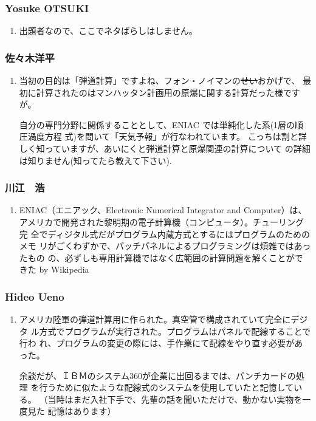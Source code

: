 \documentclass[cjk,dvipdfmx,10pt,compress,%
hyperref={bookmarks=true,bookmarksnumbered=true,bookmarksopen=false,%
colorlinks=false,%
pdftitle={第 109 回 関西 Debian 勉強会},%
pdfauthor={倉敷・のがた・佐々木・かわだ},%
pdfsubject={資料},%
}]{beamer}
\begin{document}
\begin{frame}
  \frametitle{ Yosuke OTSUKI }
  \begin{enumerate}
  \item 出題者なので、ここでネタばらしはしません。
  \end{enumerate}
\end{frame}

\begin{frame}
  \frametitle{ 佐々木洋平 }
  \begin{enumerate}
  \item 当初の目的は「弾道計算」ですよね、フォン・ノイマンの\sout{せい}おかげで、
    最初に計算されたのはマンハッタン計画用の原爆に関する計算だった様ですが。

    自分の専門分野に関係することとして、ENIAC では単純化した系(1層の順圧渦度方程
    式)を問いて「天気予報」が行なわれています。
    こっちは割と詳しく知っていますが、あいにくと弾道計算と原爆関連の計算について
    の詳細は知りません(知ってたら教えて下さい).
  \end{enumerate}
\end{frame}

\begin{frame}
  \frametitle{ 川江　浩 }
  \begin{enumerate}
  \item ENIAC（エニアック、Electronic Numerical Integrator and Computer）は、
    アメリカで開発された黎明期の電子計算機（コンピュータ）。チューリング完
    全でディジタル式だがプログラム内蔵方式とするにはプログラムのためのメモ
    リがごくわずかで、パッチパネルによるプログラミングは煩雑ではあったもの
    の、必ずしも専用計算機ではなく広範囲の計算問題を解くことができた
    by Wikipedia
  \end{enumerate}
\end{frame}

\begin{frame}
  \frametitle{ Hideo Ueno }
  \begin{enumerate}
  \item アメリカ陸軍の弾道計算用に作られた。真空管で構成されていて完全にデジタ
    ル方式でプログラムが実行された。プログラムはパネルで配線することで行わ
    れ、プログラムの変更の際には、手作業にて配線をやり直す必要があった。

    余談だが、ＩＢＭのシステム360が企業に出回るまでは、パンチカードの処理
    を行うために似たような配線式のシステムを使用していたと記憶している。
    （当時はまだ入社下手で、先輩の話を聞いただけで、動かない実物を一度見た
    記憶はあります）
  \end{enumerate}
\end{frame}
\end{document}
